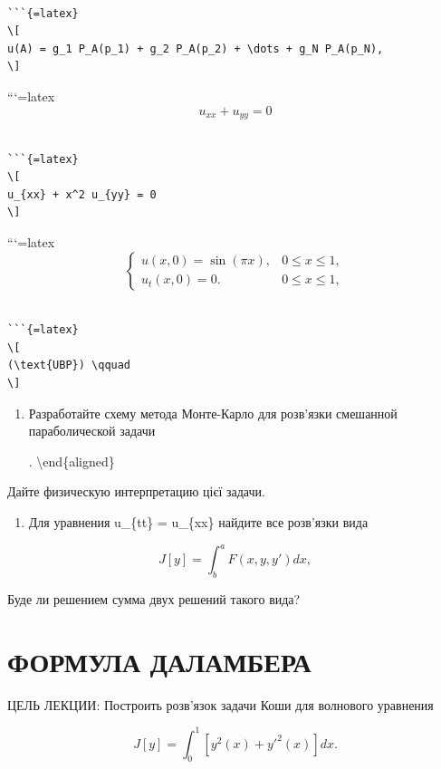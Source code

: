 \documentclass[
  ukrainian,
]{article}
\providecommand{\tightlist}{%
  \setlength{\itemsep}{0pt}\setlength{\parskip}{0pt}}
\begin{document}
\begin{verbatim}

```{=latex}
\[
u(A) = g_1 P_A(p_1) + g_2 P_A(p_2) + \dots + g_N P_A(p_N),
\]
\end{verbatim}

```{=latex}
\[
u_{xx} + u_{yy} = 0
\]

\begin{verbatim}

```{=latex}
\[
u_{xx} + x^2 u_{yy} = 0
\]
\end{verbatim}

```{=latex}
\[
\begin{cases} u(x, 0) = \sin(\pi x), & 0 \le x \le 1, \\ u_t(x, 0) = 0. & 0 \le x \le 1, \end{cases}
\]

\begin{verbatim}

```{=latex}
\[
(\text{UBP}) \qquad
\]
\end{verbatim}

\begin{enumerate}
\def\labelenumi{\arabic{enumi}.}
\setcounter{enumi}{4}
\item
  Разработайте схему метода Монте-Карло для розв'язки смешанной
  параболической задачи

  \right. \textbackslash end\{aligned\}
\end{enumerate}

Дайте физическую интерпретацию цієї задачи.

\begin{enumerate}
\def\labelenumi{\arabic{enumi}.}
\setcounter{enumi}{3}
\tightlist
\item
  Для уравнения u\_\{tt\} = u\_\{xx\} найдите все розв'язки вида
\end{enumerate}

\[
J[y] = \int_{b}^{a} F(x, y, y') dx,
\]

Буде ли решением сумма двух решений такого вида?

\section{ФОРМУЛА
ДАЛАМБЕРА}\label{ux444ux43eux440ux43cux443ux43bux430-ux434ux430ux43bux430ux43cux431ux435ux440ux430}

ЦЕЛЬ ЛЕКЦИИ: Построить розв'язок задачи Коши для волнового уравнения

\[
J[y] = \int_{0}^{1} [y^{2}(x) + y'^{2}(x)] dx.
\]
\end{document}
